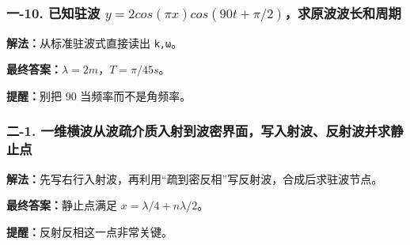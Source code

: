 \documentclass[12pt,a4paper]{ctexart}
\begin{document}
\subsubsection*{一-10. 已知驻波 \(y=2cos(πx)cos(90t+π/2)\)，求原波波长和周期}
\begin{tcolorbox}[colback=gray!2!white,colframe=black!60,title={题目}]

\end{tcolorbox}
\begin{tcolorbox}[colback=blue!2!white,colframe=blue!55!black,title={完整答案}]
\textbf{解法：}从标准驻波式直接读出 \texttt{k,ω}。\par
\textbf{最终答案：}\(λ=2 m\)，\(T=π/45 s\)。\par

\end{tcolorbox}
\begin{tcolorbox}[colback=red!2!white,colframe=red!55!black,title={易错点}]
\textbf{提醒：}别把 90 当频率而不是角频率。\par
\end{tcolorbox}

\subsubsection*{二-1. 一维横波从波疏介质入射到波密界面，写入射波、反射波并求静止点}
\begin{tcolorbox}[colback=gray!2!white,colframe=black!60,title={题目}]

\end{tcolorbox}
\begin{tcolorbox}[colback=blue!2!white,colframe=blue!55!black,title={完整答案}]
\textbf{解法：}先写右行入射波，再利用“疏到密反相”写反射波，合成后求驻波节点。\par
\textbf{最终答案：}静止点满足 \(x=λ/4+nλ/2\)。\par

\end{tcolorbox}
\begin{tcolorbox}[colback=red!2!white,colframe=red!55!black,title={易错点}]
\textbf{提醒：}反射反相这一点非常关键。\par
\end{tcolorbox}
\end{document}
